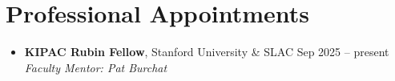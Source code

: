 \section{Professional Appointments}

\begin{itemize}
    \item \textbf{KIPAC Rubin Fellow}, Stanford University \& SLAC
    \hfill Sep 2025 -- present \\
    \textit{Faculty Mentor: Pat Burchat}
\end{itemize}